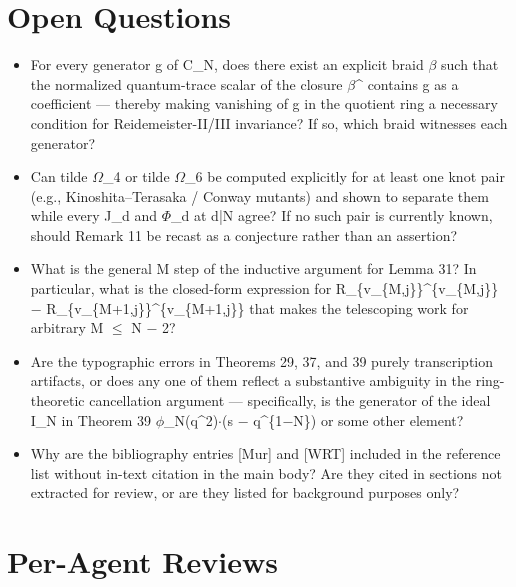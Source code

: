 \documentclass[11pt]{article}
\begin{document}
\section*{Open Questions}
\begin{itemize}[leftmargin=*]
  \item For every generator g of C\_N, does there exist an explicit braid \ensuremath{\beta} such that the normalized quantum-trace scalar of the closure \ensuremath{\beta}\^{} contains g as a coefficient --- thereby making vanishing of g in the quotient ring a necessary condition for Reidemeister-II/III invariance? If so, which braid witnesses each generator?
  \item Can tilde \ensuremath{\Omega}\_4 or tilde \ensuremath{\Omega}\_6 be computed explicitly for at least one knot pair (e.g., Kinoshita--Terasaka / Conway mutants) and shown to separate them while every J\_d and \ensuremath{\Phi}\_d at d|N agree? If no such pair is currently known, should Remark 11 be recast as a conjecture rather than an assertion?
  \item What is the general M step of the inductive argument for Lemma 31? In particular, what is the closed-form expression for R\_\{v\_\{M,j\}\}\^{}\{v\_\{M,j\}\} \ensuremath{-} R\_\{v\_\{M+1,j\}\}\^{}\{v\_\{M+1,j\}\} that makes the telescoping work for arbitrary M \ensuremath{\le} N \ensuremath{-} 2?
  \item Are the typographic errors in Theorems 29, 37, and 39 purely transcription artifacts, or does any one of them reflect a substantive ambiguity in the ring-theoretic cancellation argument --- specifically, is the generator of the ideal I\_N in Theorem 39 \ensuremath{\phi}\_N(q\^{}2)\ensuremath{\cdot}(s \ensuremath{-} q\^{}\{1\ensuremath{-}N\}) or some other element?
  \item Why are the bibliography entries [Mur] and [WRT] included in the reference list without in-text citation in the main body? Are they cited in sections not extracted for review, or are they listed for background purposes only?
\end{itemize}

\section*{Per-Agent Reviews}
\end{document}
